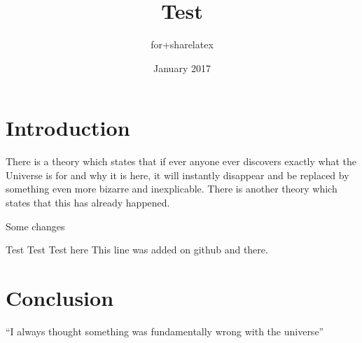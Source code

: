 \documentclass{article}
\title{Test}
\author{for+sharelatex }
\date{January 2017}
\begin{document}
\maketitle

\section{Introduction}
There is a theory which states that if ever anyone ever discovers exactly what the Universe is for and why it is here, it will instantly disappear and be replaced by something even more bizarre and inexplicable.
There is another theory which states that this has already happened.

Some changes

Test Test Test here
This line was added on github and there.

\section{Conclusion}
``I always thought something was fundamentally wrong with the universe'' 



\end{document}
